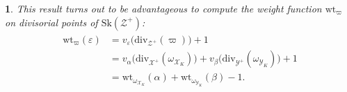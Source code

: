 \documentclass{amsart}%
\numberwithin{equation}{subsection}
\theoremstyle{plain2}
\theoremstyle{definition2}
\theoremstyle{stepstyle}
\theoremstyle{point}
\theoremstyle{subpoint}
\newtheorem{subpoint}[equation]{}%
\newcommand{\spa}[1]{\begin{subpoint}#1\end{subpoint}}           %
\newcommand{\R}{\ensuremath{\mathbb{R}}}
\newcommand{\cX}{\ensuremath{\mathscr{X}}}
\newcommand{\cY}{\ensuremath{\mathscr{Y}}}
\newcommand{\cZ}{\ensuremath{\mathscr{Z}}}
\renewcommand{\R}{\ensuremath{\mathbb{R}}}
\renewcommand{\cZ}{\ensuremath{\mathscr{Z}}}
\renewcommand{\cY}{\ensuremath{\mathscr{Y}}}
\newcommand{\divisor}{\mathrm{div}}
\newcommand{\weight}{\mathrm{wt}}
\newcommand{\Sk}{\mathrm{Sk}}
\begin{document}
{%
%
%
%
%
%
}
\spa{This result turns out to be advantageous to compute the weight function $\weight_\varpi$ on divisorial points of $\Sk(\cZ^+)$: 
\begin{align} \label{equ weight function product}
\begin{split}
\weight_\varpi(\varepsilon)
& = v_{\varepsilon}\big(\divisor_{\cZ^+}(\varpi)\big) +1 \\
& = v_{\alpha}\big(\divisor_{\cX^+}(\omega_{\cX_K})\big) + v_{\beta}\big(\divisor_{\cY^+}(\omega_{\cY_K})\big) + 1 \\
& = \weight_{\omega_{\cX_K}}(\alpha) + \weight_{\omega_{\cY_K}}(\beta) - 1.
\end{split}
\end{align}
}
\end{document}
